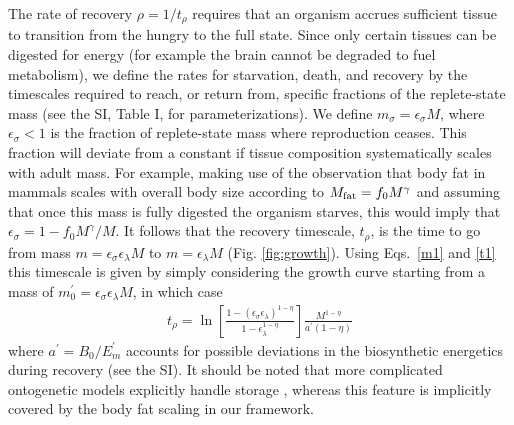 \documentclass[twocolumn,preprintnumbers,amsmath,amssymb,superscriptaddress]{revtex4}
\begin{document}
\begin{bibunit}[unsrt]
{  The rate of recovery $\rho = 1/t_\rho$ requires that an organism accrues
  sufficient tissue to transition from the hungry to the full state.  Since
  only certain tissues can be digested for energy (for example the brain cannot
  be degraded to fuel metabolism), we define the rates for starvation, death,
  and recovery by the timescales required to reach, or return from, specific
  fractions of the replete-state mass (see the SI, Table I, for
  parameterizations).  We define $m_{\sigma}=\epsilon_{\sigma} M$, where
  $\epsilon_{\sigma}<1$ is the fraction of replete-state mass where
  reproduction ceases. This fraction will deviate from a constant if tissue
  composition systematically scales with adult mass.  For example, making use
  of the observation that body fat in mammals scales with overall body size
  according to $M_{\rm fat}=f_{0}M^{\gamma}$ and assuming that once this mass
  is fully digested the organism starves, this would imply that
  $\epsilon_{\sigma}=1-f_{0}M^{\gamma}/M$. It follows that the recovery
  timescale, $t_{\rho}$, is the time to go from mass
  $m=\epsilon_{\sigma} \epsilon_{\lambda} M$ to $m=\epsilon_{\lambda}M$
  (Fig. \ref{fig:growth}). Using Eqs.~\eqref{m1} and \eqref{t1} this timescale
  is given by simply considering the growth curve starting from a mass of
  $m_{0}^{\prime}=\epsilon_{\sigma}\epsilon_{\lambda}M$, in which case
  \begin{eqnarray}
  \label{rhotimescale}
  t_{\rho}=\ln\left[\frac{1-\left(\epsilon_{\sigma}\epsilon_{\lambda}\right)^{1-\eta}}{1-\epsilon_\lambda^{1-\eta}}\right]\frac{M^{1-\eta}}{a^{\prime}\left(1-\eta\right)}
  \end{eqnarray}
  where $a^{\prime}=B_{0}/E_{m}^{\prime}$ accounts for possible deviations in
  the biosynthetic energetics during recovery (see the SI). It should be noted that more complicated ontogenetic models explicitly handle
  storage \citep{hou}, whereas this feature is implicitly covered by the body
  fat scaling in our framework.



}
\end{bibunit}
\end{document}
